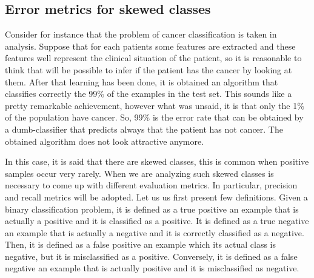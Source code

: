 \documentclass[aps,letterpaper,10pt]{revtex4}
\begin{document}
%

\subsection{Error metrics for skewed classes}
Consider for instance that the problem of cancer classification is taken in analysis. Suppose that for each patients some features are extracted and these features well represent the clinical situation of the patient, so it is reasonable to think that will be possible to infer if the patient has the cancer by looking at them. After that learning has been done, it is obtained an algorithm that classifies correctly the 99\% of the examples in the test set. This sounds like a pretty remarkable achievement, however what was unsaid, it is that only the 1\% of the population have cancer. So, 99\% is the error rate that can be obtained by a dumb-classifier that predicts always that the patient has not cancer. The obtained algorithm does not look attractive anymore. 

In this case, it is said that there are skewed classes, this is common when positive samples occur very rarely. When we are analyzing such skewed classes is necessary to come up with different evaluation metrics. In particular, precision and recall metrics will be adopted. Let us us first present few definitions. Given a binary classification problem, it is defined as a true positive an example that is actually a positive and it is classified as a positive. It is defined as a true negative an example that is actually a negative and it is correctly classified as a negative. Then, it is defined as a false positive an example which its actual class is negative, but it is misclassified as a positive. Conversely, it is defined as a false negative an example that is actually positive and it is misclassified as negative. 
\end{document}
